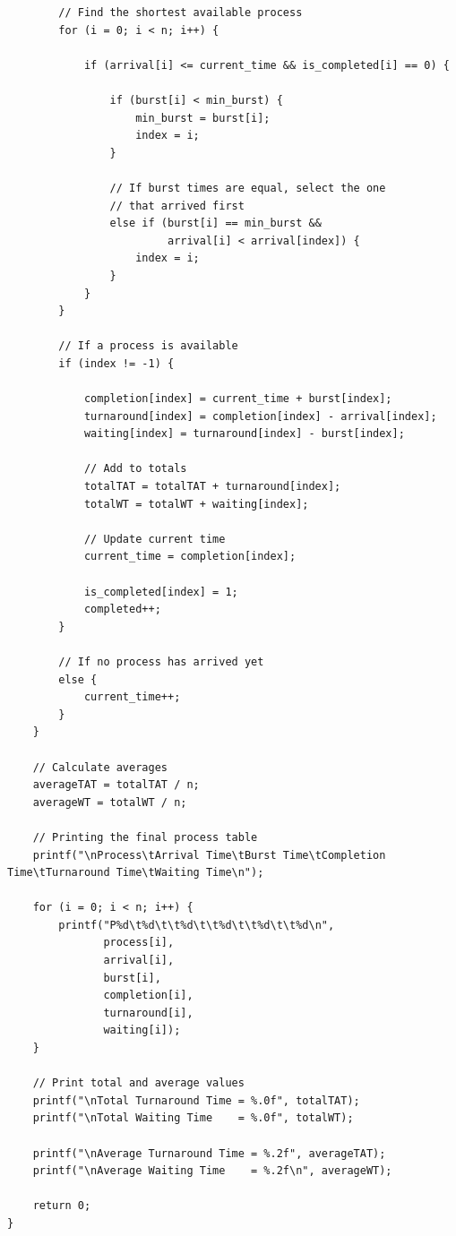 \documentclass[10pt,a4paper]{article}
\begin{document}
\begin{lstlisting}
        // Find the shortest available process
        for (i = 0; i < n; i++) {

            if (arrival[i] <= current_time && is_completed[i] == 0) {

                if (burst[i] < min_burst) {
                    min_burst = burst[i];
                    index = i;
                }

                // If burst times are equal, select the one
                // that arrived first
                else if (burst[i] == min_burst &&
                         arrival[i] < arrival[index]) {
                    index = i;
                }
            }
        }

        // If a process is available
        if (index != -1) {

            completion[index] = current_time + burst[index];
            turnaround[index] = completion[index] - arrival[index];
            waiting[index] = turnaround[index] - burst[index];

            // Add to totals
            totalTAT = totalTAT + turnaround[index];
            totalWT = totalWT + waiting[index];

            // Update current time
            current_time = completion[index];

            is_completed[index] = 1;
            completed++;
        }

        // If no process has arrived yet
        else {
            current_time++;
        }
    }

    // Calculate averages
    averageTAT = totalTAT / n;
    averageWT = totalWT / n;

    // Printing the final process table
    printf("\nProcess\tArrival Time\tBurst Time\tCompletion Time\tTurnaround Time\tWaiting Time\n");

    for (i = 0; i < n; i++) {
        printf("P%d\t%d\t\t%d\t\t%d\t\t%d\t\t%d\n",
               process[i],
               arrival[i],
               burst[i],
               completion[i],
               turnaround[i],
               waiting[i]);
    }

    // Print total and average values
    printf("\nTotal Turnaround Time = %.0f", totalTAT);
    printf("\nTotal Waiting Time    = %.0f", totalWT);

    printf("\nAverage Turnaround Time = %.2f", averageTAT);
    printf("\nAverage Waiting Time    = %.2f\n", averageWT);

    return 0;
}
\end{lstlisting}
\end{document}
